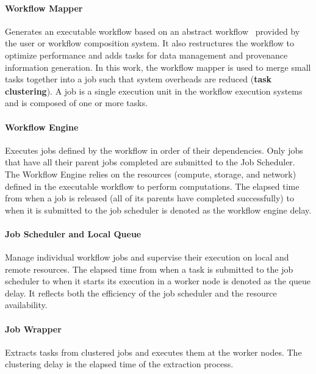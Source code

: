 \documentclass{IOS-Book-Article}
\begin{document}
\paragraph{Workflow Mapper} Generates an executable workflow based on an abstract workflow~\cite{Deelman2004} provided by the user or workflow composition system. It also restructures the workflow to optimize performance and adds tasks for data management and provenance information generation. In this work, the workflow mapper is used to merge small tasks together into a job such that system overheads are reduced (\textbf{task clustering}). A job is a single execution unit in the workflow execution systems and is composed of one or more tasks. 

\paragraph{Workflow Engine} Executes jobs defined by the workflow in order of their dependencies. Only jobs that have all their parent jobs completed are submitted to the Job Scheduler. The Workflow Engine relies on the resources (compute, storage, and network) defined in the executable workflow to perform computations. The elapsed time from when a job is released (all of its parents have completed successfully) to when it is submitted to the job scheduler is denoted as the workflow engine delay. %

\paragraph{Job Scheduler and Local Queue} Manage individual workflow jobs and supervise their execution on local and remote resources. The elapsed time from when a task is submitted to the job scheduler to when it starts its execution in a worker node is denoted as the queue delay. It reflects both the efficiency of the job scheduler and the resource availability. 

\paragraph{Job Wrapper} Extracts tasks from clustered jobs and executes them at the worker nodes. The clustering delay is the  elapsed time of the extraction process.
\end{document}
